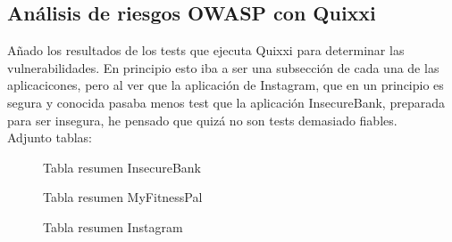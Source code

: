 \documentclass[12pt,twoside]{article}
\begin{document}
\subsection{Análisis de riesgos OWASP con Quixxi}
Añado los resultados de los tests que ejecuta Quixxi para determinar las vulnerabilidades. En principio esto iba a ser una subsección de cada una de las aplicacicones, pero al ver que la aplicación de Instagram, que en un principio es segura y conocida pasaba menos test que la aplicación InsecureBank, preparada para ser insegura, he pensado que quizá no son tests demasiado fiables.\\
Adjunto tablas:
\begin{figure}[H]
    \centering
    \caption{Tabla resumen InsecureBank}
\end{figure}

\begin{figure}[H]
    \centering
    \caption{Tabla resumen MyFitnessPal}
\end{figure}

\begin{figure}[H]
    \centering
    \caption{Tabla resumen Instagram}
\end{figure}
\end{document}
